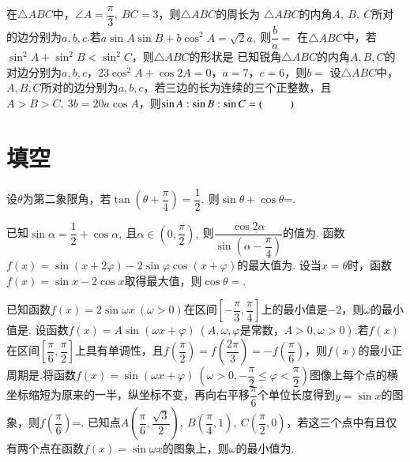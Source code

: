 \documentclass{BHCexam}
\begin{document}
\begin{questions}
\qs 在$\triangle ABC$中，$ \angle A=\dfrac{\pi}{3},~BC=3 $，则$ \triangle ABC $的周长为\xx
{}
\qs $\triangle ABC$的内角$ A,~B,~C $所对的边分别为$ a,b,c $.若$ a\sin A\sin B+b\cos^2A=\sqrt{2}a,~ $则$ \dfrac{b}{a}=$\xx
{}
\qs 在$ \triangle ABC $中，若$ \sin ^2A+\sin^2 B<\sin ^2C $，则$ \triangle ABC $的形状是\xx
{}
\qs 已知锐角$\triangle ABC$的内角$A,B,C$的对边分别为$a,b,c$，$23\cos^2A+\cos 2A=0$，$a=7$，$c=6$，则$b=$\xx
{}
\qs 设$\triangle ABC$中，$ A,B,C $所对的边分别为$ a,b,c $，若三边的长为连续的三个正整数，且$ A>B>C ,~3b=20 a\cos A$，则$ \sin A:\sin B:\sin C =\xx$
\section{填空}
\qs 设$\theta$为第二象限角，若$ \tan\left(\theta +\dfrac{\pi}{4}\right)=\dfrac{1}{2},~ $则$ \sin \theta+\cos \theta $=\tk.

\qs 已知$\sin \alpha=\dfrac{1}{2}+\cos \alpha,~$且$ \alpha\in \left(0,\dfrac{\pi}{2}\right),~ $则$ \dfrac{\cos 2\alpha}{\sin \left(\alpha-\dfrac{\pi}{4}\right)} $的值为\tk.
\question 函数$f(x)=\sin (x+2\varphi)-2\sin \varphi \cos(x+\varphi)$的最大值为\tk.
\question 设当$x=\theta$时，函数$f(x)=\sin x-2\cos x$取得最大值，则$\cos \theta=$\tk.

\qs 已知函数$f(x)=2\sin \omega x~(\omega>0)$在区间$ \left[-\dfrac{\pi}{3},\dfrac{\pi}{4}\right] $上的最小值是$ -2 $，则$ \omega $的最小值是\tk.
\qs 设函数$ f(x)=A\sin (\omega x+\varphi)~(A,\omega,\varphi \text{是常数，}A>0,\omega>0)$.若$ f(x) $在区间$ \left[\dfrac{\pi}{6},\dfrac{\pi}{2}\right] $上具有单调性，且$f(\dfrac{\pi}{2})=f(\dfrac{2\pi}{3})=-f(\dfrac{\pi}{6}) $，则$ f(x) $的最小正周期是\tk.\qs 将函数$f(x)=\sin (\omega x+\varphi)~\left(\omega >0,-\dfrac{\pi}{2}\le \varphi< \dfrac{\pi}{2}\right)$图像上每个点的横坐标缩短为原来的一半，纵坐标不变，再向右平移$ \dfrac{\pi}{6} $个单位长度得到$ y=\sin x $的图象，则$ f\left(\dfrac{\pi}{6}\right) $=\tk.
\qs 已知点$ A\left(\dfrac{\pi}{6},\dfrac{\sqrt{3}}{2}\right),~B\left(\dfrac{\pi}{4},1\right),~C\left(\dfrac{\pi}{2},0\right)$，若这三个点中有且仅有两个点在函数$f(x)=\sin \omega x$的图象上，则$ \omega $的最小值为\tk.


\end{questions}
\end{document}
